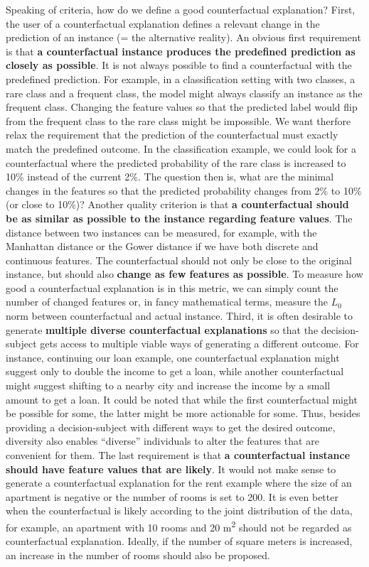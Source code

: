 \documentclass[12pt,]{krantz}
\begin{document}
Speaking of criteria, how do we define a good counterfactual
explanation? First, the user of a counterfactual explanation defines a
relevant change in the prediction of an instance (= the alternative
reality). An obvious first requirement is that \textbf{a counterfactual
instance produces the predefined prediction as closely as possible}. It
is not always possible to find a counterfactual with the predefined
prediction. For example, in a classification setting with two classes, a
rare class and a frequent class, the model might always classify an
instance as the frequent class. Changing the feature values so that the
predicted label would flip from the frequent class to the rare class
might be impossible. We want therfore relax the requirement that the
prediction of the counterfactual must exactly match the predefined
outcome. In the classification example, we could look for a
counterfactual where the predicted probability of the rare class is
increased to 10\% instead of the current 2\%. The question then is, what
are the minimal changes in the features so that the predicted
probability changes from 2\% to 10\% (or close to 10\%)? Another quality
criterion is that \textbf{a counterfactual should be as similar as
possible to the instance regarding feature values}. The distance between
two instances can be measured, for example, with the Manhattan distance
or the Gower distance if we have both discrete and continuous features.
The counterfactual should not only be close to the original instance,
but should also \textbf{change as few features as possible}. To measure
how good a counterfactual explanation is in this metric, we can simply
count the number of changed features or, in fancy mathematical terms,
measure the \(L_0\) norm between counterfactual and actual instance.
Third, it is often desirable to generate \textbf{multiple diverse
counterfactual explanations} so that the decision-subject gets access to
multiple viable ways of generating a different outcome. For instance,
continuing our loan example, one counterfactual explanation might
suggest only to double the income to get a loan, while another
counterfactual might suggest shifting to a nearby city and increase the
income by a small amount to get a loan. It could be noted that while the
first counterfactual might be possible for some, the latter might be
more actionable for some. Thus, besides providing a decision-subject
with different ways to get the desired outcome, diversity also enables
``diverse'' individuals to alter the features that are convenient for
them. The last requirement is that \textbf{a counterfactual instance
should have feature values that are likely}. It would not make sense to
generate a counterfactual explanation for the rent example where the
size of an apartment is negative or the number of rooms is set to 200.
It is even better when the counterfactual is likely according to the
joint distribution of the data, for example, an apartment with 10 rooms
and 20 m\textsuperscript{2} should not be regarded as counterfactual
explanation. Ideally, if the number of square meters is increased, an
increase in the number of rooms should also be proposed.
\end{document}
